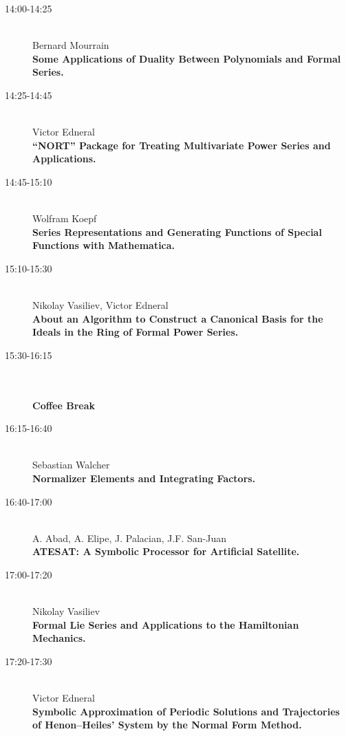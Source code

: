 \begin{description}
\item[14:00-14:25] \ \\
  Bernard Mourrain\\
  {\bf Some Applications of Duality Between Polynomials and Formal Series.} 
\item[14:25-14:45] \ \\
  Victor Edneral\\
  {\bf ``NORT'' Package for Treating Multivariate Power Series and
    Applications.} 
\item[14:45-15:10] \ \\
  Wolfram Koepf\\
  {\bf Series Representations and Generating Functions of Special
    Functions with Mathematica.} 
\item[15:10-15:30] \ \\
  Nikolay Vasiliev, Victor Edneral
\\
  {\bf About an Algorithm to Construct a Canonical Basis for the Ideals
    in the Ring of Formal Power Series.}  
\item[15:30-16:15] \ \\
  \\
  {\bf Coffee Break } 
\item[16:15-16:40 ] \ \\
  Sebastian Walcher\\
  {\bf Normalizer Elements and Integrating Factors.} 
\item[16:40-17:00] \ \\
  A. Abad, A. Elipe, J. Palacian, J.F. San-Juan\\
  {\bf ATESAT: A Symbolic Processor for Artificial Satellite.} 
\item[17:00-17:20] \ \\
  Nikolay Vasiliev\\
  {\bf Formal Lie Series and Applications to the Hamiltonian Mechanics.} 
\item[17:20-17:30] \ \\
  Victor Edneral\\
  {\bf Symbolic Approximation of Periodic Solutions and Trajectories
    of Henon--Heiles' System by the Normal Form Method.} 
\end{description}

